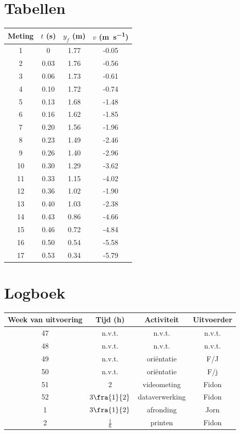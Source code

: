 \documentclass{scrartcl}
\begin{document}
\section{Tabellen}
\begin{center}
\begin{tabular}{*{4}{S[table-format=1.2]}}
\toprule
{Meting} & {$t$ (\si{\second})} & {$y_f$ (\si{\meter})} & {$v$ (\si{\meter\per\second})}\\
& 0	 & 1.77&-0.05 \\
2& 0.03 & 1.76&-0.56 \\
3 &0.06 & 1.73&-0.61 \\
4 &0.10 & 1.72&-0.74 \\
5 &0.13 & 1.68&-1.48 \\
6 &0.16 & 1.62&-1.85 \\
7 &0.20 & 1.56&-1.96 \\
8 &0.23 & 1.49&-2.46 \\
9 &0.26 & 1.40&-2.96 \\
10 &0.30 & 1.29&-3.62 \\
11 &0.33 & 1.15&-4.02 \\
12 &0.36 & 1.02&-1.90 \\
13 &0.40 & 1.03&-2.38 \\
14 &0.43 & 0.86&-4.66 \\
15& 0.46 & 0.72&-4.84 \\
16 &0.50 & 0.54&-5.58 \\
17& 0.53 & 0.34&-5.79 \\
\bottomrule
\end{tabular}
\label{tab:Kwadraat}
\end{center}
%
\newpage
\section{Logboek}
\begin{center}
\begin{tabular}[center]{*4c}
\toprule
Week van uitvoering & Tijd (\si{\hour})& Activiteit & Uitvoerder\\
\midrule
47 & n.v.t. & n.v.t. & n.v.t.\\
48 &n.v.t.  & n.v.t. & n.v.t.\\
49 & n.v.t. &ori\"{e}ntatie& F/J\\
50 &  n.v.t.&  ori\"{e}ntatie&F/j \\
51 &  2     &videometing  &Fidon \\
52 &  $3\fra{1}{2}$     &dataverwerking  &Fidon \\
1  &  $3\fra{1}{2} $    &afronding  &Jorn \\
2 &  $\frac{1}{6}$&printen  &Fidon \\
\bottomrule
\end{tabular}
\end{center}
\end{document}
